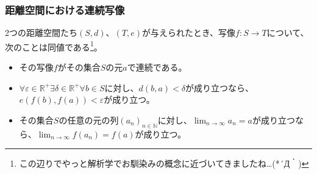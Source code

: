 \documentclass[dvipdfmx]{jsarticle}
\begin{document}
\subsubsection{距離空間における連続写像}%
\begin{thm}\label{8.2.1.14}
2つの距離空間たち$(S,d)$、$(T,e)$が与えられたとき、写像$f:S \rightarrow T$について、次のことは同値である\footnote{この辺りでやっと解析学でお馴染みの概念に近づいてきましたね…(*´Д｀)}。
\begin{itemize}
\item
  その写像$f$がその集合$S$の元$a$で連続である。
\item
  $\forall\varepsilon \in \mathbb{R}^{+}\exists\delta \in \mathbb{R}^{+}\forall b \in S$に対し、$d(b,a) < \delta$が成り立つなら、$e\left( f(b),f(a) \right) < \varepsilon$が成り立つ。
\item
  その集合$S$の任意の元の列$\left( a_{n} \right)_{n \in \mathbb{N}}$に対し、$\lim_{n \rightarrow \infty}a_{n} = a$が成り立つなら、$\lim_{n \rightarrow \infty}{f\left( a_{n} \right)} = f(a)$が成り立つ。
\end{itemize}
\end{thm}
\end{document}
